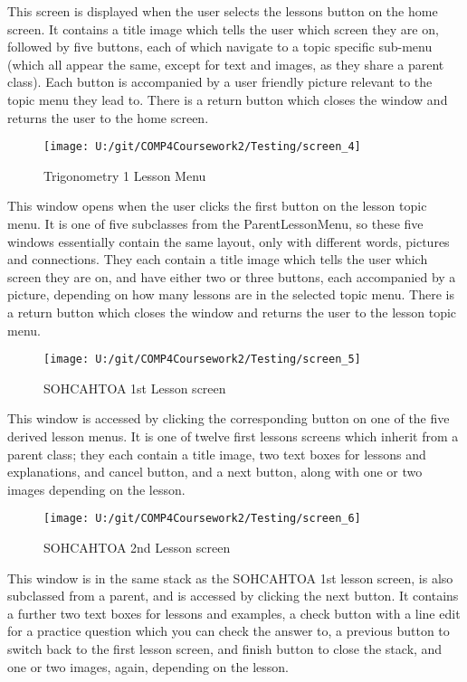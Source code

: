 This screen is displayed when the user selects the lessons button on the home screen. It contains a title image which tells the user which screen they are on, followed by five buttons, each of which navigate to a topic specific sub-menu (which all appear the same, except for text and images, as they share a parent class). Each button is accompanied by a user friendly picture relevant to the topic menu they lead to. There is a return button which closes the window and returns the user to the home screen.

\begin{figure}[H]
    \label{fig: Second Screen}\caption{Trigonometry 1 Lesson Menu}
    \texttt{[image: U:/git/COMP4Coursework2/Testing/screen\_4]}
\end{figure}

This window opens when the user clicks the first button on the lesson topic menu. It is one of five subclasses from the ParentLessonMenu, so these five windows essentially contain the same layout, only with different words, pictures and connections. They each contain a title image which tells the user which screen they are on, and have either two or three buttons, each accompanied by a picture, depending on how many lessons are in the selected topic menu. There is a return button which closes the window and returns the user to the lesson topic menu.

\begin{figure}[H]
    \label{fig: Second Screen}\caption{SOHCAHTOA 1st Lesson screen}
    \texttt{[image: U:/git/COMP4Coursework2/Testing/screen\_5]}
\end{figure}

This window is accessed by clicking the corresponding button on one of the five derived lesson menus. It is one of twelve first lessons screens which inherit from a parent class; they each contain a title image, two text boxes for lessons and explanations, and cancel button, and a next button, along with one or two images depending on the lesson.

\begin{figure}[H]
    \label{fig: Second Screen}\caption{SOHCAHTOA 2nd Lesson screen}
    \texttt{[image: U:/git/COMP4Coursework2/Testing/screen\_6]}
\end{figure}

This window is in the same stack as the SOHCAHTOA 1st lesson screen, is also subclassed from a parent, and is accessed by clicking the next button. It contains a further two text boxes for lessons and examples, a check button with a line edit for a practice question which you can check the answer to, a previous button to switch back to the first lesson screen, and finish button to close the stack, and one or two images, again, depending on the lesson.

